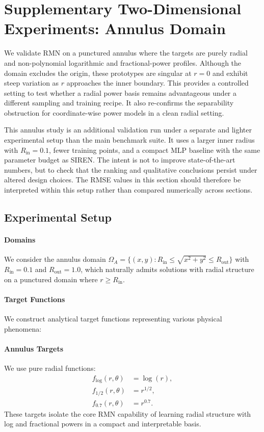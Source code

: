 \documentclass[twoside,11pt]{article}
\begin{document}
\section{Supplementary Two-Dimensional Experiments: Annulus Domain}
\label{sec:app_exp2d}

We validate RMN on a punctured annulus where the targets are purely radial and non-polynomial logarithmic and fractional-power profiles. Although the domain excludes the origin, these prototypes are singular at $r=0$ and exhibit steep variation as $r$ approaches the inner boundary. This provides a controlled setting to test whether a radial power basis remains advantageous under a different sampling and training recipe. It also re-confirms the separability obstruction for coordinate-wise power models in a clean radial setting.

This annulus study is an additional validation run under a separate and lighter experimental setup than the main benchmark suite. It uses a larger inner radius with $R_{\text{in}}=0.1$, fewer training points, and a compact MLP baseline with the same parameter budget as SIREN. The intent is not to improve state-of-the-art numbers, but to check that the ranking and qualitative conclusions persist under altered design choices. The RMSE values in this section should therefore be interpreted within this setup rather than compared numerically across sections.

\subsection{Experimental Setup}

\paragraph{Domains}
We consider the annulus domain $\Omega_A = \{(x,y) : R_{\text{in}} \leq \sqrt{x^2+y^2} \leq R_{\text{out}}\}$ with $R_{\text{in}}=0.1$ and $R_{\text{out}}=1.0$, which naturally admits solutions with radial structure on a punctured domain where $r \ge R_{\text{in}}$.

\paragraph{Target Functions}
We construct analytical target functions representing various physical phenomena:

\paragraph{Annulus Targets}
We use pure radial functions:
\begin{align}
	f_{\log}(r,\theta) & = \log(r), \label{eq:app_a1_log}   \\
	f_{1/2}(r,\theta)  & = r^{1/2}, \label{eq:app_a1_sqrt}  \\
	f_{0.7}(r,\theta)  & = r^{0.7}. \label{eq:app_a1_power}
\end{align}
These targets isolate the core RMN capability of learning radial structure with log and fractional powers in a compact and interpretable basis.
\end{document}
